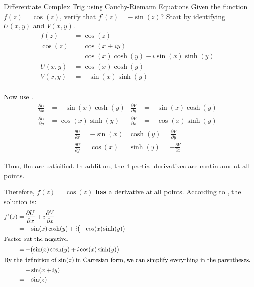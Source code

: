 \begin{example}[Lecture 5]{Differentiate Complex Trig using Cauchy-Riemann Equations}
  Given the function $f(z) = \cos(z)$, verify that $f'(z) = -\sin(z)$?
  \tcblower{}
  Start by identifying $U(x, y)$ and $V(x, y)$.
  \begin{align*}
    f(z) &= \cos(z) \\
    \cos(z) &= \cos(x + iy) \\
         &= \cos(x) \cosh(y) - i \sin(x) \sinh(y) \\
    U(x, y) &= \cos(x) \cosh(y) \\
    V(x, y) &= -\sin(x) \sinh(y) \\
  \end{align*}

  Now use .
  \begin{align*}
    \frac{\partial U}{\partial x} &= -\sin(x) \cosh(y) & \frac{\partial V}{\partial y} &= -\sin(x) \cosh(y) \\
    \frac{\partial U}{\partial y} &= \cos(x) \sinh(y) & \frac{\partial V}{\partial x} &= -\cos(x) \sinh(y)
  \end{align*}
  \begin{align*}
    \frac{\partial U}{\partial x} = -\sin(x)& \cosh(y) = \frac{\partial V}{\partial y} \\
    \frac{\partial U}{\partial y} = \cos(x)&\sinh(y) = -\frac{\partial V}{\partial x}
  \end{align*}

  Thus, the  are satisified.
  In addition, the 4 partial derivatives are continuous at all points.

  Therefore, $f(z) = \cos(z)$ \textbf{has} a derivative at all points.
  According to , the solution is:
  \begin{align*}
    f'(z) &= \frac{\partial U}{\partial x} + i \frac{\partial V}{\partial x} \\
          &= -\sin(x) \cosh(y) + i \bigl( -\cos(x) \sinh(y) \bigr) \\
    \shortintertext{Factor out the negative.}
          &= - \bigl( \sin(x) \cosh(y) + i \cos(x) \sinh(y) \bigr) \\
    \shortintertext{By the definition of $\sin(z)$ in Cartesian form, we can simplify everything in the parentheses.}
          &= -\sin(x + iy) \\
          &= -\sin(z)
  \end{align*}
\end{example}

